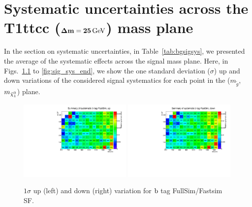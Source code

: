 
\chapter[Systematic uncertainties for signal]{Systematic uncertainties across the T1ttcc
(\texorpdfstring{$\mathbf{\Delta m = 25}\,\text{Ge\hspace{-.08em}V}$}{Dm=25GeV}) mass plane 
\label{app:signal_systematics}}

In the section on systematic uncertainties, in Table~\ref{tab:bgsigsys}, we presented the average of
the systematic effects across the signal mass plane. Here, in Figs.~\ref{fig:sig_sys_1} to
\ref{fig:sig_sys_end}, we show the one standard deviation ($\sigma$) up and down variations of the
considered signal systematics for each point in the ($m_{\tilde{g}}$,$m_{\tilde{\chi}_1^0}$) plane. 

\vspace{1eM}

\begin{figure}[htpb]
\includegraphics[width=0.49\textwidth]{figures/app_sig_syst/sys_b-tag-FastSim_up}
\includegraphics[width=0.49\textwidth]{figures/app_sig_syst/sys_b-tag-FastSim_down}
\caption{$1\sigma$ up (left) and down (right) variation for $\mathrm{b}$ tag FullSim/Fastsim SF.
\label{fig:sig_sys_1}}
\end{figure}

